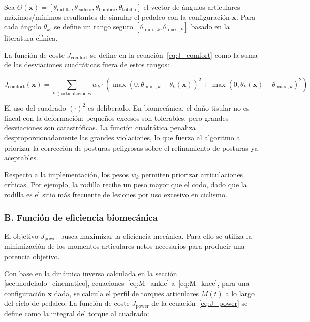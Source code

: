 Sea $\Theta(\mathbf{x}) = [\theta_{\text{rodilla}}, \theta_{\text{cadera}},
  \theta_{\text{hombro}}, \theta_{\text{tobillo}}]$ el vector de ángulos
articulares máximos/mínimos resultantes de simular el pedaleo con la
configuración $\mathbf{x}$. Para cada ángulo $\theta_k$, se define un rango
seguro $[\theta_{\min, k}, \theta_{\max, k}]$ basado en la literatura clínica.

La función de coste $J_{\text{comfort}}$ se define en la ecuación~\ref{eq:J_comfort} como la suma de las
desviaciones cuadráticas fuera de estos rangos:

\begin{equation}
  \label{eq:J_comfort}
  J_{\text{comfort}}(\mathbf{x}) = \sum_{k \in \text{articulaciones}} w_k \cdot \left( \max(0, \theta_{\min,k} - \theta_k(\mathbf{x}))^2 + \max(0, \theta_k(\mathbf{x}) - \theta_{\max,k})^2 \right)
\end{equation}

El uso del cuadrado $(\cdot)^2$ es deliberado. En biomecánica, el daño tisular
no es lineal con la deformación; pequeños excesos son tolerables, pero grandes
desviaciones son catastróficas. La función cuadrática penaliza
desproporcionadamente las grandes violaciones, lo que fuerza al algoritmo a
priorizar la corrección de posturas peligrosas sobre el refinamiento de
posturas ya aceptables.

Respecto a la implementación, los pesos $w_k$ permiten priorizar articulaciones
críticas. Por ejemplo, la rodilla recibe un peso mayor que el codo, dado que la
rodilla es el sitio más frecuente de lesiones por uso excesivo en ciclismo.

\subsubsection{B. Función de eficiencia biomecánica}

El objetivo $J_{\text{power}}$ busca maximizar la eficiencia mecánica. Para
ello se utiliza la minimización de los momentos articulares netos necesarios
para producir una potencia objetivo.

Con base en la dinámica inversa calculada en la sección
\ref{sec:modelado_cinematico}, ecuaciones~\ref{eq:M_ankle} a~\ref{eq:M_knee}, para una configuración $\mathbf{x}$ dada, se
calcula el perfil de torques articulares $M(t)$ a lo largo del ciclo de
pedaleo. La función de coste $J_{\text{power}}$ de la ecuación~\ref{eq:J_power} se define como la integral del torque al cuadrado:

